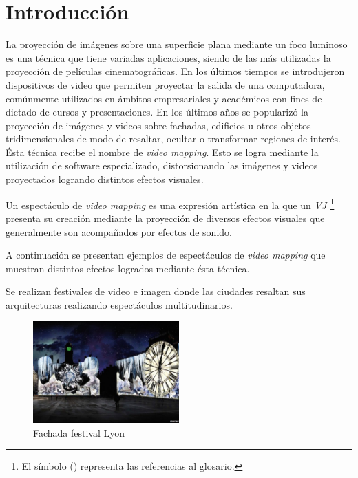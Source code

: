 ﻿\chapter{Introducción}


La proyección de imágenes sobre una superficie plana mediante un foco luminoso es una técnica que tiene variadas aplicaciones, siendo de las más utilizadas la proyección de películas cinematográficas. En los últimos tiempos se introdujeron dispositivos de video que permiten proyectar la salida de una computadora, comúnmente utilizados en ámbitos empresariales y académicos con fines de dictado de cursos y presentaciones. En los últimos años se popularizó la proyección de imágenes y videos sobre fachadas, edificios u otros objetos tridimensionales de modo de resaltar, ocultar o transformar regiones de interés. Ésta técnica recibe el nombre de \emph{video mapping}.
Esto se logra mediante la utilización de software especializado, distorsionando las imágenes y videos proyectados logrando distintos efectos visuales.

Un espectáculo de \emph{video mapping} es una expresión artística en la que un \emph{VJ}$^\dagger$\footnote{El símbolo (\dag) representa las referencias al glosario.} presenta su creación mediante la proyección de diversos efectos visuales que generalmente son acompañados por efectos de sonido.


A continuación se presentan ejemplos de espectáculos de \emph{video mapping} que muestran distintos efectos logrados mediante ésta técnica.

Se realizan festivales de video e imagen donde las ciudades resaltan sus arquitecturas realizando espectáculos multitudinarios.

\begin{figure}[H]
  \centering
    \includegraphics[width=0.5\textwidth]{./Cap1_intro/Fachada3.jpg}
  \caption[http://www.weltlighting.com/]{Fachada festival Lyon}
  \label{fig:Fachada}
\end{figure}

